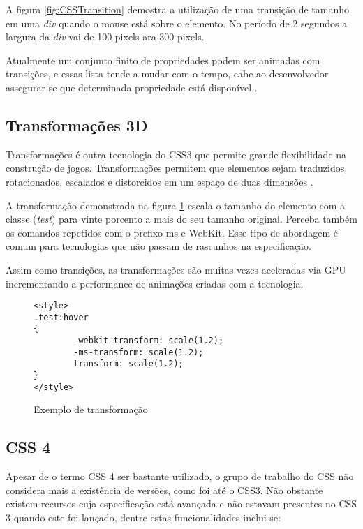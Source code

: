 A figura \ref{fig:CSSTransition} demostra a utilização de uma
transição de tamanho em uma \textit{div} quando o mouse está sobre o
elemento. No período de 2 segundos a largura da \textit{div} vai de 100
pixels ara 300 pixels.

Atualmente um conjunto finito de propriedades podem ser animadas
com transições, e essas lista tende a mudar com o tempo, cabe ao
desenvolvedor assegurar-se que determinada propriedade está disponível
\autocite{mdnTransitions}.

\subsection{Transformações 3D}

Transformações é outra tecnologia do CSS3 que permite grande
flexibilidade na construção de jogos. Transformações permitem que
elementos sejam traduzidos, rotacionados, escalados e distorcidos em um
espaço de duas dimensões \autocite{html5mostwanted}.

A transformação demonstrada na figura \ref{fig:CSSTransform} escala o
tamanho do elemento com a classe (\textit{test}) para vinte porcento a
mais do seu tamanho original. Perceba também os comandos repetidos com
o prefixo ms e WebKit. Esse tipo de abordagem é comum para tecnologias
que não passam de rascunhos na especificação.

Assim como transições, as transformações são muitas vezes aceleradas
via GPU incrementando a performance de animações criadas com a tecnologia.

\begin{figure}[H]
\centering
\begin{verbatim}
<style>
.test:hover
{
        -webkit-transform: scale(1.2);
        -ms-transform: scale(1.2);
        transform: scale(1.2);
}
</style>
\end{verbatim}
\caption{Exemplo de transformação}
\label{fig:CSSTransform}
\end{figure}

\subsection{CSS 4}

Apesar de o termo CSS 4 ser bastante utilizado, o grupo de trabalho do CSS
não considera mais a existência de versões, como foi até o CSS3.
Não obstante existem recursos cuja especificação está avançada e não estavam presentes
no CSS 3 quando este foi lançado, dentre estas funcionalidades inclui-se:

